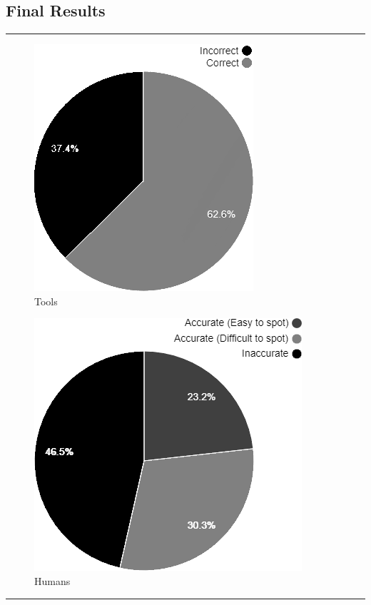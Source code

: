 \newpage
\subsection{Final Results} 

\hrule
\begin{minipage}{0.5\textwidth}
\begin{figure}[H]
    \caption{Tools}
    \includegraphics[scale=0.75]{./Images/VSCA avg.png}
\end{figure}
\end{minipage}
\hspace{0.8cm}
\begin{minipage}{0.45\textwidth}\raggedleft
\begin{figure}[H]
    \caption{Humans}
    \includegraphics[scale=0.75]{./Images/avg.png}
\end{figure}

\end{minipage}
\vspace{0.4cm}
\hrule
\vspace{0.4cm}


